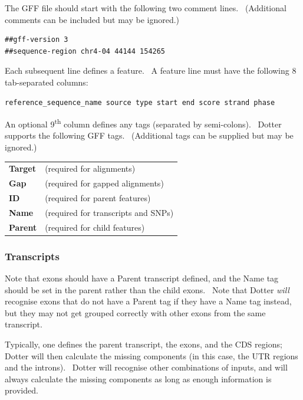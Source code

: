 \documentclass{report}
\begin{document}
{The GFF file should start with the following two comment lines.
\ (Additional comments can be included but may be ignored.)

\bigskip

\begin{verbatim}
##gff-version 3
##sequence-region chr4-04 44144 154265
\end{verbatim}
Each subsequent line defines a feature. \ A feature line must have the
following 8 tab-separated columns:
\begin{verbatim}
reference_sequence_name source type start end score strand phase
\end{verbatim}
An optional 9\textsuperscript{th} column defines any tags (separated by
semi-colons). \ Dotter supports the following GFF tags. \ (Additional
tags can be supplied but may be ignored.)

\begin{center}
\begin{supertabular}{p{2.802cm}p{10.704cm}}
\textbf{Target } & (required for alignments) \\
\textbf{Gap} & (required for gapped alignments) \\
\textbf{ID } & (required for parent features) \\
\textbf{Name } & (required for transcripts and SNPs) \\
\textbf{Parent } & (required for child features) \\
\end{supertabular}
\end{center}
}

{\color[rgb]{0.30980393,0.5058824,0.7411765}\subsubsection{Transcripts}}
{Note that exons should have a Parent transcript defined, and the Name
tag should be set in the parent rather than the child exons. \ Note
that Dotter \textit{will} recognise exons that do not have a Parent tag
if they have a Name tag instead, but they may not get grouped correctly
with other exons from the same transcript.}

\bigskip

{Typically, one defines the parent transcript, the exons, and the CDS
regions; Dotter will then calculate the missing components (in this
case, the UTR regions and the introns). \ Dotter will recognise other
combinations of inputs, and will always calculate the missing
components as long as enough information is provided. }
\end{document}
